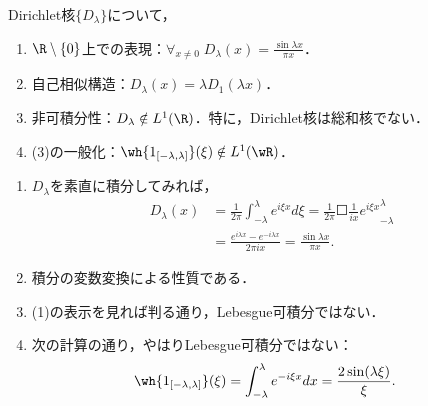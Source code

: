\documentclass[uplatex,dvipdfmx]{jsreport}
\begin{document}
\begin{proposition}[Dirichlet核の性質]\label{prop-property-of-Dirichlet-kernel-on-R1}
    Dirichlet核$\{D_\lambda\}$について，
    \begin{enumerate}
        \item $\R\setminus\{0\}$上での表現：$\forall_{x\ne0}\;D_\lambda(x)=\frac{\sin\lambda x}{\pi x}$．
        \item 自己相似構造：$D_\lambda(x)=\lambda D_1(\lambda x)$．
        \item 非可積分性：$D_\lambda\notin L^1(\R)$．特に，Dirichlet核は総和核でない．
        \item (3)の一般化：$\wh{1_{[-\lambda,\lambda]}}(\xi)\notin L^1(\wR)$．
    \end{enumerate}
\end{proposition}
\begin{Proof}\mbox{}
    \begin{enumerate}
        \item $D_\lambda$を素直に積分してみれば，
        \begin{align*}
            D_\lambda(x)&=\frac{1}{2\pi}\int^\lambda_{-\lambda}e^{i\xi x}d\xi=\frac{1}{2\pi}\Square{\frac{1}{ix}e^{i\xi x}}^\lambda_{-\lambda}\\
            &=\frac{e^{i\lambda x}-e^{-i\lambda x}}{2\pi ix}=\frac{\sin \lambda x}{\pi x}.
        \end{align*}
        \item 積分の変数変換による性質である．
        \item (1)の表示を見れば判る通り，Lebesgue可積分ではない．
        \item 次の計算の通り，やはりLebesgue可積分ではない：
        \begin{align*}
            \wh{1_{[-\lambda,\lambda]}}(\xi)&=\int^\lambda_{-\lambda}e^{-i\xi x}dx=\frac{2\sin(\lambda\xi)}{\xi}.
        \end{align*}
    \end{enumerate}
\end{Proof}
\end{document}
